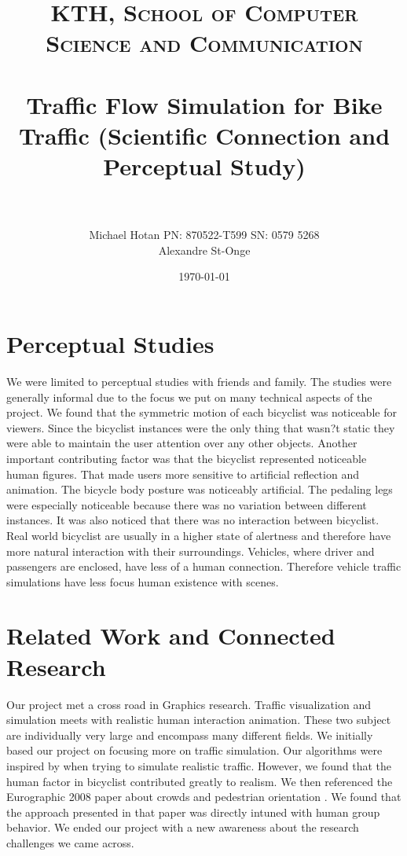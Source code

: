 \documentclass[paper=a4, fontsize=11pt]{scrartcl} %
\title{	
\normalfont \normalsize 
\textsc{KTH, School of Computer Science and Communication } \\ [25pt] %
\horrule{0.5pt} \\[0.4cm] %
\huge Traffic Flow Simulation for Bike Traffic (Scientific Connection and Perceptual Study) \\ %
\horrule{2pt} \\[0.5cm] %
}
\author{Michael Hotan PN: 870522-T599 SN: 0579 5268\\ Alexandre St-Onge}
\date{\normalsize\today} %
\begin{document}
\maketitle %


\section*{Perceptual Studies}

We were limited to perceptual studies with friends and family.  The studies were generally informal due to the focus we put on many technical aspects of the project.  We found that the symmetric motion of each bicyclist was noticeable for viewers.  Since the bicyclist instances were the only thing that wasn?t static they were able to maintain the user attention over any other objects.  Another important contributing factor was that the bicyclist represented noticeable human figures.  That made users more sensitive to artificial reflection and animation.  The bicycle body posture was noticeably artificial.  The pedaling legs were especially noticeable because there was no variation between different instances.  It was also noticed that there was no interaction between bicyclist.   Real world bicyclist are usually in a higher state of alertness and therefore have more natural interaction with their surroundings.  Vehicles, where driver and passengers are enclosed, have less of a human connection.  Therefore vehicle traffic simulations have less focus human existence with scenes.   
	
\section*{Related Work and Connected Research}

Our project met a cross road in Graphics research. Traffic visualization and simulation meets with realistic human interaction animation.  These two subject are individually very large and encompass many different fields.  We initially based our project on \citep{wilkie2013flow} focusing more on traffic simulation.  Our algorithms were inspired by \citep{lighthill1955kinematic} when trying to simulate realistic traffic.  However, we found that the human factor in bicyclist contributed greatly to realism.  We then referenced the Eurographic 2008 paper about crowds and pedestrian orientation \citep{peters2008crowds}.  We found that the approach presented in that paper was directly intuned with human group behavior.  We ended our project with a new awareness about the research challenges we came across.
	
\end{document}
